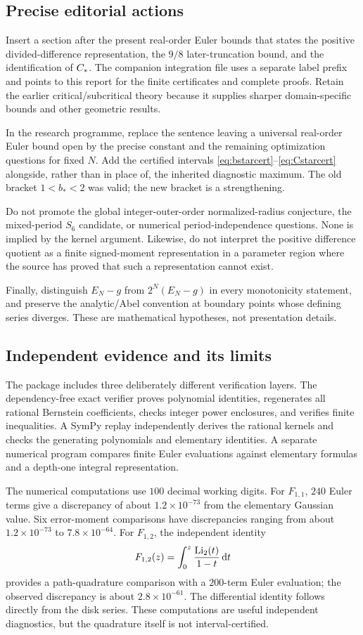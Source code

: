 \subsection{Precise editorial actions}
Insert a section after the present real-order Euler bounds that states the positive divided-difference representation, the $9/8$ later-truncation bound, and the identification of $C_*$. The companion integration file uses a separate label prefix and points to this report for the finite certificates and complete proofs. Retain the earlier critical/subcritical theory because it supplies sharper domain-specific bounds and other geometric results.

In the research programme, replace the sentence leaving a universal real-order Euler bound open by the precise constant and the remaining optimization questions for fixed $N$. Add the certified intervals \eqref{eq:bstarcert}--\eqref{eq:Cstarcert} alongside, rather than in place of, the inherited diagnostic maximum. The old bracket $1<b_*<2$ was valid; the new bracket is a strengthening.

Do not promote the global integer-outer-order normalized-radius conjecture, the mixed-period $S_6$ candidate, or numerical period-independence questions. None is implied by the kernel argument. Likewise, do not interpret the positive difference quotient as a finite signed-moment representation in a parameter region where the source has proved that such a representation cannot exist.

Finally, distinguish $E_N-g$ from $2^N(E_N-g)$ in every monotonicity statement, and preserve the analytic/Abel convention at boundary points whose defining series diverges. These are mathematical hypotheses, not presentation details.

\subsection{Independent evidence and its limits}
The package includes three deliberately different verification layers. The dependency-free exact verifier proves polynomial identities, regenerates all rational Bernstein coefficients, checks integer power enclosures, and verifies finite inequalities. A SymPy replay independently derives the rational kernels and checks the generating polynomials and elementary identities. A separate numerical program compares finite Euler evaluations against elementary formulas and a depth-one integral representation.

The numerical computations use $100$ decimal working digits. For $F_{1,1}$, $240$ Euler terms give a discrepancy of about $1.2\times10^{-73}$ from the elementary Gaussian value. Six error-moment comparisons have discrepancies ranging from about $1.2\times10^{-73}$ to $7.8\times10^{-64}$. For $F_{1,2}$, the independent identity
\[
 F_{1,2}(z)=\int_0^z\frac{\operatorname{Li}_2(t)}{1-t}\,\mathrm d t
\]
provides a path-quadrature comparison with a $200$-term Euler evaluation; the observed discrepancy is about $2.8\times10^{-61}$. The differential identity follows directly from the disk series. These computations are useful independent diagnostics, but the quadrature itself is not interval-certified.


